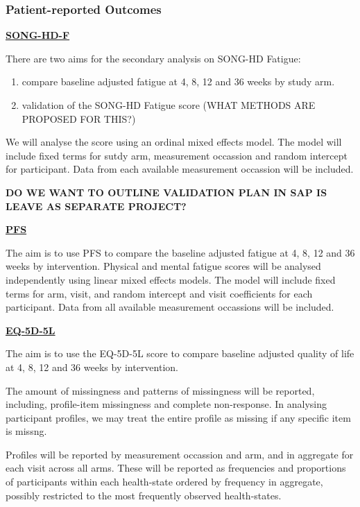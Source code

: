 \documentclass[
]{article}
\providecommand{\tightlist}{%
  \setlength{\itemsep}{0pt}\setlength{\parskip}{0pt}}
\begin{document}
\hypertarget{patient-reported-outcomes}{%
\subsubsection{Patient-reported Outcomes}\label{patient-reported-outcomes}}

\label{analysis:song-hd-f}
\hyperref[outcome:song-hd-f]{\textbf{SONG-HD-F}}

There are two aims for the secondary analysis on SONG-HD Fatigue:

\begin{enumerate}
  \tightlist
  \item compare baseline adjusted fatigue at 4, 8, 12 and 36 weeks by study arm.
  \item validation of the SONG-HD Fatigue score (WHAT METHODS ARE PROPOSED FOR THIS?)
\end{enumerate}

We will analyse the score using an ordinal mixed effects model.
The model will include fixed terms for sutdy arm, measurement occassion and random intercept for participant.
Data from each available measurement occassion will be included.

\textbf{DO WE WANT TO OUTLINE VALIDATION PLAN IN SAP IS LEAVE AS SEPARATE PROJECT?}

\label{analysis:pfs}
\hyperref[outcome:pfs]{\textbf{PFS}}

The aim is to use PFS to compare the baseline adjusted fatigue at 4, 8, 12 and 36 weeks by intervention.
Physical and mental fatigue scores will be analysed independently using linear mixed effects models.
The model will include fixed terms for arm, visit, and random intercept and visit coefficients for each participant.
Data from all available measurement occassions will be included.


\label{analysis:eq5d5l}
\hyperref[outcome:eq5d5l]{\textbf{EQ-5D-5L}}

The aim is to use the EQ-5D-5L score to compare baseline adjusted quality of life at 4, 8, 12 and 36 weeks by intervention.

The amount of missingness and patterns of missingness will be reported, including, profile-item missingness and complete non-response.
In analysing participant profiles, we may treat the entire profile as missing if any specific item is missng.

Profiles will be reported by measurement occassion and arm, and in aggregate for each visit across all arms.
These will be reported as frequencies and proportions of participants within each health-state ordered by frequency in aggregate, possibly restricted to the most frequently observed health-states.
\end{document}
